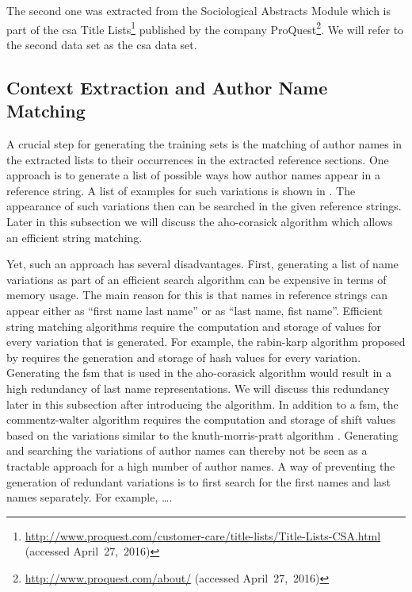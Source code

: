 \bigskip

The second one was extracted from the Sociological Abstracts Module which is part of the \gls{csa} Title Lists\footnote{\url{http://www.proquest.com/customer-care/title-lists/Title-Lists-CSA.html} (accessed April~27,~2016)} published by the company ProQuest\footnote{\url{http://www.proquest.com/about/} (accessed April~27,~2016)}.
We will refer to the second data set as the \gls{csa} data set.


\subsection{Context Extraction and Author Name Matching}
A crucial step for generating the training sets is the matching of author names in the extracted lists to their occurrences in the extracted reference sections.
One approach is to generate a list of possible ways how author names appear in a reference string.
A list of examples for such variations is shown in .
The appearance of such variations then can be searched in the given reference strings.
Later in this subsection we will discuss the \gls{aho-corasick algorithm} which allows an efficient string matching.

\bigskip

Yet, such an approach has several disadvantages.
First, generating a list of name variations as part of an efficient search algorithm can be expensive in terms of memory usage.
The main reason for this is that names in reference strings can appear either as ``first name last name'' or as ``last name, fist name''.
Efficient string matching algorithms require the computation and storage of values for every variation that is generated.
For example, the \gls{rabin-karp algorithm} proposed by \citet{karp1987efficient} requires the generation and storage of hash values for every variation.
Generating the \gls{fsm} that is used in the \gls{aho-corasick algorithm} would result in a high redundancy of last name representations.
We will discuss this redundancy later in this subsection after introducing the algorithm.
In addition to a \gls{fsm}, the \gls{commentz-walter algorithm} \citep{commentz1979string} requires the computation and storage of shift values based on the variations similar to the \gls{knuth-morris-pratt algorithm} \citep{knuth1977fast}.
Generating and searching the variations of author names can thereby not be seen as a tractable approach for a high number of author names.
A way of preventing the generation of redundant variations is to first search for the first names and last names separately.
For example, \dots{}.

